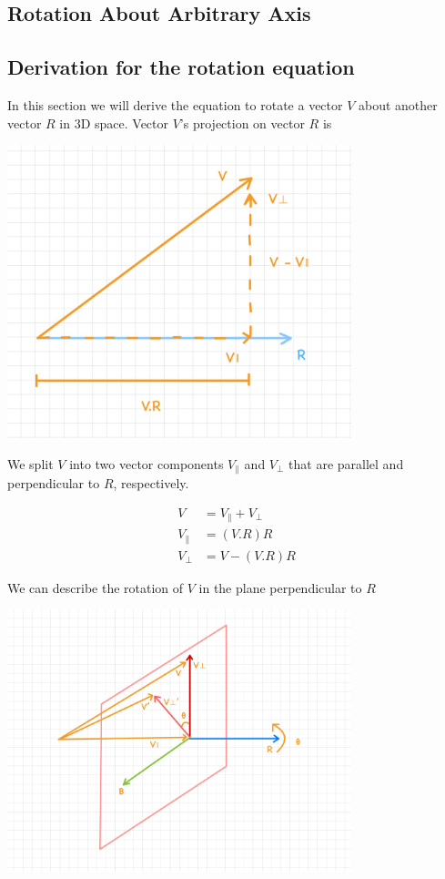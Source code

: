\documentclass{article}
\begin{document}
    \begin{center}
        \section*{Rotation About Arbitrary Axis}
    \end{center}

    \subsection*{Derivation for the rotation equation}
    
    In this section we will derive the equation to rotate a vector $V$ about another vector $R$ in 3D space. Vector $V$'s projection
    on vector $R$ is

    \includegraphics[width=0.75\textwidth]{../images/VectorProjection.jpg}

    \noindent We split $V$ into two vector components $V_{\parallel}$ and $V_{\perp}$ that are parallel and perpendicular to $R$, respectively.

    \begin{align}
        V &= V_{\parallel} + V_{\perp} \\
        V_{\parallel} &= (V.R) R \label{eq:vparallel} \\
        V_{\perp} &= V - (V.R) R \label{eq:vperp}
    \end{align}

    \noindent We can describe the rotation of $V$ in the plane perpendicular to $R$

    \includegraphics[width=0.75\textwidth]{../images/Rotation_About_ArbitraryAxis.jpg}
\end{document}
